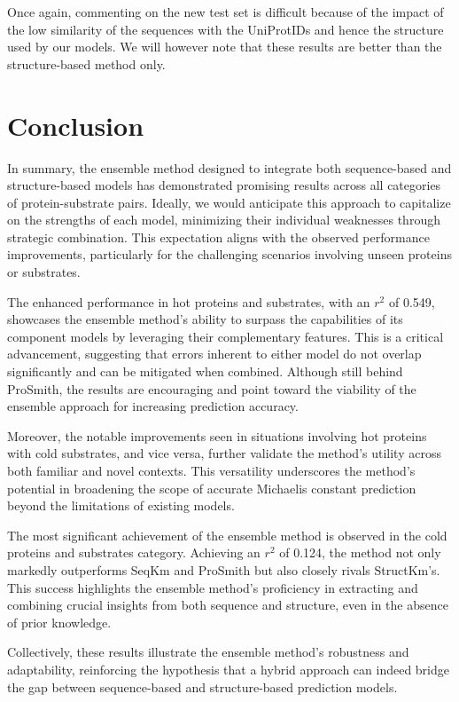 Once again, commenting on the new test set is difficult because of the impact of the low similarity of the sequences with the UniProtIDs and hence the structure used by our models. We will however note that these results are better than the structure-based method only. 

\section{Conclusion}
In summary, the ensemble method designed to integrate both sequence-based and structure-based models has demonstrated promising results across all categories of protein-substrate pairs. Ideally, we would anticipate this approach to capitalize on the strengths of each model, minimizing their individual weaknesses through strategic combination. This expectation aligns with the observed performance improvements, particularly for the challenging scenarios involving unseen proteins or substrates.

The enhanced performance in hot proteins and substrates, with an $r^2$ of 0.549, showcases the ensemble method's ability to surpass the capabilities of its component models by leveraging their complementary features. This is a critical advancement, suggesting that errors inherent to either model do not overlap significantly and can be mitigated when combined. Although still behind ProSmith, the results are encouraging and point toward the viability of the ensemble approach for increasing prediction accuracy.

Moreover, the notable improvements seen in situations involving hot proteins with cold substrates, and vice versa, further validate the method's utility across both familiar and novel contexts. This versatility underscores the method's potential in broadening the scope of accurate Michaelis constant prediction beyond the limitations of existing models.

The most significant achievement of the ensemble method is observed in the cold proteins and substrates category. Achieving an $r^2$ of 0.124, the method not only markedly outperforms SeqKm and ProSmith but also closely rivals StructKm's. This success highlights the ensemble method's proficiency in extracting and combining crucial insights from both sequence and structure, even in the absence of prior knowledge.

Collectively, these results illustrate the ensemble method's robustness and adaptability, reinforcing the hypothesis that a hybrid approach can indeed bridge the gap between sequence-based and structure-based prediction models.